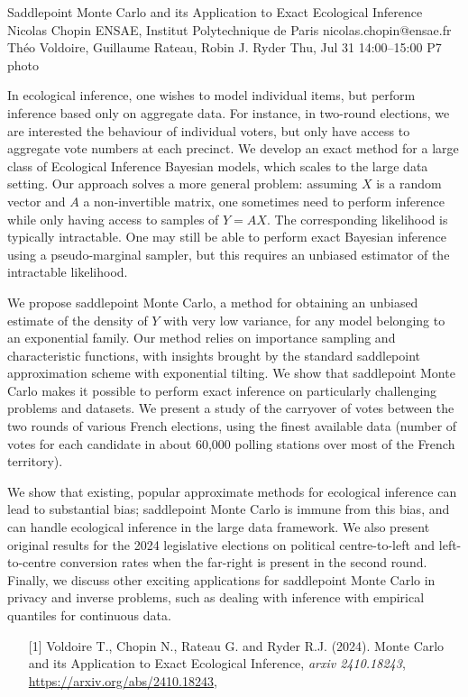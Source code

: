 \clearpage
\begin{talk}
  {Saddlepoint Monte Carlo and its Application to Exact Ecological Inference}%
  {Nicolas Chopin}%
  {ENSAE, Institut Polytechnique de Paris}%
  {nicolas.chopin@ensae.fr}%
  {Théo Voldoire, Guillaume Rateau, Robin J. Ryder}%
  {}%
  {Thu, Jul 31 14:00–15:00}%
  {P7}%
  {photo}%
  
				
			

In ecological inference, one wishes to model individual items, but perform
inference based only on aggregate data.  For instance, in two-round elections,
we are interested the behaviour of individual voters, but only have access to
aggregate vote numbers at each precinct.  We develop an exact method for a
large class of Ecological Inference Bayesian models, which scales  to the large
data setting.  Our approach solves a more general problem:  assuming $X$ is a
random vector and $A$ a non-invertible matrix, one sometimes need to perform
inference while only having access to samples of $Y=AX$. The corresponding
likelihood is typically intractable. One may still be able to perform exact
Bayesian inference using a pseudo-marginal sampler, but this requires an
unbiased estimator of the intractable likelihood.

We propose saddlepoint Monte Carlo, a method for obtaining an unbiased estimate
of the density of $Y$ with very low variance, for any model belonging to an
exponential family. Our method relies on importance sampling and 
characteristic functions, with insights brought by the standard saddlepoint
approximation scheme with exponential tilting.  We show that saddlepoint Monte
Carlo makes it possible to perform exact inference on particularly challenging
problems and datasets.  We present a study of the carryover of votes between
the two rounds of various French elections, using the finest available data
(number of votes for each candidate in about 60,000 polling stations over most
of the French territory). 

We show that existing, popular approximate methods for ecological inference can
lead to substantial bias; saddlepoint Monte Carlo is immune from this bias, and 
can handle ecological inference in the large data framework. We also
present original results for the 2024 legislative elections on political
centre-to-left and left-to-centre conversion rates when the far-right is
present in the second round. Finally, we discuss other exciting applications
for saddlepoint Monte Carlo in privacy and inverse problems, such as dealing
with inference with empirical quantiles for continuous data.

\medskip

\begin{enumerate}
	\item[{[1]}] 
      Voldoire T., Chopin N., Rateau G. and Ryder R.J. (2024).
      Monte Carlo and its Application to Exact Ecological Inference, 
      \textit{arxiv 2410.18243},
      \url{https://arxiv.org/abs/2410.18243}, 
\end{enumerate}

\end{talk}

